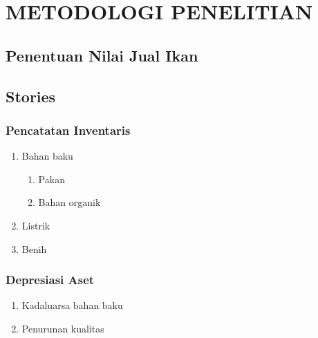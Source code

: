 
\chapter{METODOLOGI PENELITIAN}

\section{}

\section{Penentuan Nilai Jual Ikan}

\section{Stories}

    \subsection{Pencatatan Inventaris}

    \begin{enumerate}
        \item Bahan baku
        \begin{enumerate}
            \item Pakan
            \item Bahan organik
        \end{enumerate}
        \item Listrik
        \item Benih
    \end{enumerate}

    \subsection{Depresiasi Aset}

    \begin{enumerate}
        \item Kadaluarsa bahan baku
        \item Penurunan kualitas
    \end{enumerate}
